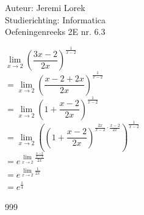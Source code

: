 \documentclass[a4paper]{article}
\begin{document}
  
\noindent \large Auteur: Jeremi Lorek \\
\noindent \large Studierichting:  Informatica\\
\noindent \large Oefeningenreeks 2E nr. 6.3\\

\medskip

\normalsize


$\lim\limits_{x \to 2} \left( \dfrac{3x - 2}{2x} \right)^{\tfrac{1}{x-2}}$  \\

$= \lim\limits_{x \to 2} \left( \dfrac{x-2 + 2x}{2x} \right)^{\tfrac{1}{x-2}}$  \\

$= \lim\limits_{x \to 2} \left( 1 + \dfrac{x-2}{2x} \right)^{\tfrac{1}{x-2}}$  \\

$= \lim\limits_{x \to 2} \left( \left( 1 + \dfrac{x-2}{2x} \right)^{\tfrac{2x}{x-2} \cdot \tfrac{x-2}{2x}} \right)^{\tfrac{1}{x-2}}$  \\

$= e^{\lim\limits_{x \to 2} \tfrac{\tfrac{x-2}{x-2}}{2x}}$  \\

$= e^{\lim\limits_{x \to 2} \tfrac{1}{2x}}$  \\

$= e^{\tfrac{1}{4}}$  \\



\begin{thebibliography}{999}
\end{thebibliography}
\end{document}
